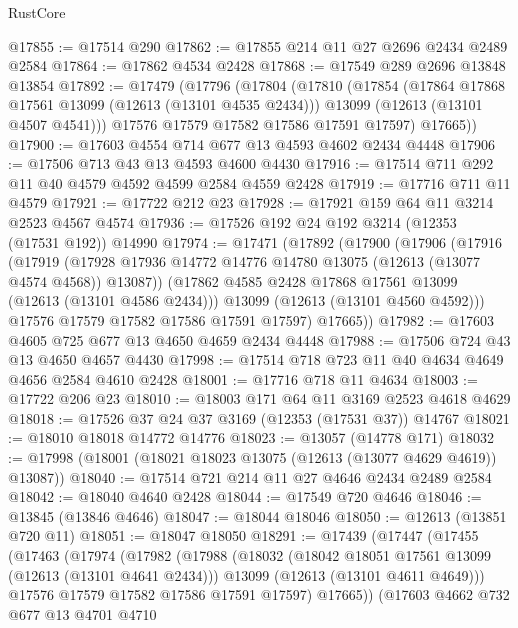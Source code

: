 \begin{lexlean}{RustCore}
\begin{coremodule}
@17855 := @17514 @290
@17862 := @17855 @214 @11 @27 @2696 @2434 @2489 @2584
@17864 := @17862 @4534 @2428
@17868 := @17549 @289 @2696 @13848 @13854
@17892 := @17479
    (@17796
      (@17804
        (@17810
          (@17854
            (@17864 @17868 @17561 @13099 (@12613 (@13101 @4535 @2434)))
            @13099
            (@12613 (@13101 @4507 @4541)))
          @17576
          @17579
          @17582
          @17586
          @17591
          @17597)
        @17665))
@17900 := @17603 @4554 @714 @677 @13 @4593 @4602 @2434 @4448
@17906 := @17506 @713 @43 @13 @4593 @4600 @4430
@17916 := @17514 @711 @292 @11 @40 @4579 @4592 @4599 @2584 @4559 @2428
@17919 := @17716 @711 @11 @4579
@17921 := @17722 @212 @23
@17928 := @17921 @159 @64 @11 @3214 @2523 @4567 @4574
@17936 := @17526 @192 @24 @192 @3214 (@12353 (@17531 @192)) @14990
@17974 := @17471
    (@17892
      (@17900
        (@17906
          (@17916
            (@17919
              (@17928 @17936 @14772 @14776 @14780 @13075 (@12613 (@13077 @4574 @4568)) @13087))
            (@17862 @4585 @2428 @17868 @17561 @13099 (@12613 (@13101 @4586 @2434)))
            @13099
            (@12613 (@13101 @4560 @4592)))
          @17576
          @17579
          @17582
          @17586
          @17591
          @17597)
        @17665))
@17982 := @17603 @4605 @725 @677 @13 @4650 @4659 @2434 @4448
@17988 := @17506 @724 @43 @13 @4650 @4657 @4430
@17998 := @17514 @718 @723 @11 @40 @4634 @4649 @4656 @2584 @4610 @2428
@18001 := @17716 @718 @11 @4634
@18003 := @17722 @206 @23
@18010 := @18003 @171 @64 @11 @3169 @2523 @4618 @4629
@18018 := @17526 @37 @24 @37 @3169 (@12353 (@17531 @37)) @14767
@18021 := @18010 @18018 @14772 @14776
@18023 := @13057 (@14778 @171)
@18032 := @17998 (@18001 (@18021 @18023 @13075 (@12613 (@13077 @4629 @4619)) @13087))
@18040 := @17514 @721 @214 @11 @27 @4646 @2434 @2489 @2584
@18042 := @18040 @4640 @2428
@18044 := @17549 @720 @4646
@18046 := @13845 (@13846 @4646)
@18047 := @18044 @18046
@18050 := @12613 (@13851 @720 @11)
@18051 := @18047 @18050
@18291 := @17439
    (@17447
      (@17455
        (@17463
          (@17974
            (@17982
              (@17988
                (@18032
                  (@18042 @18051 @17561 @13099 (@12613 (@13101 @4641 @2434)))
                  @13099
                  (@12613 (@13101 @4611 @4649)))
                @17576
                @17579
                @17582
                @17586
                @17591
                @17597)
              @17665))
          (@17603
            @4662
            @732
            @677
            @13
            @4701
            @4710

\end{coremodule}
\end{lexlean}
